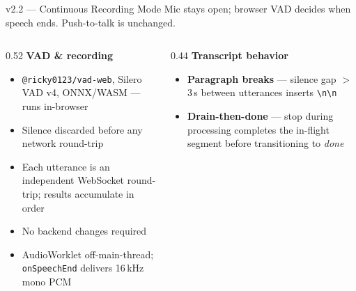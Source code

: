 \documentclass{beamer}
\begin{document}
\begin{frame}{v2.2 --- Continuous Recording Mode}
    \small
    Mic stays open; browser VAD decides when speech ends. Push-to-talk is unchanged.

    \begin{columns}[T]
        \begin{column}{0.52\textwidth}
            \footnotesize\textbf{VAD \& recording}
            \begin{itemize}\setlength{\itemsep}{0pt}\setlength{\parskip}{0pt}
                \item \texttt{@ricky0123/vad-web}, Silero VAD v4,
                      ONNX/WASM --- runs in-browser
                \item Silence discarded before any network round-trip
                \item Each utterance is an independent WebSocket
                      round-trip; results accumulate in order
                \item No backend changes required
                \item AudioWorklet off-main-thread;
                      \texttt{onSpeechEnd} delivers 16\,kHz mono PCM
            \end{itemize}
        \end{column}
        \begin{column}{0.44\textwidth}
            \footnotesize\textbf{Transcript behavior}
            \begin{itemize}\setlength{\itemsep}{0pt}\setlength{\parskip}{0pt}
                \item \textbf{Paragraph breaks} --- silence gap
                      $>$\,3\,s between utterances inserts \texttt{\textbackslash n\textbackslash n}
                \item \textbf{Drain-then-done} --- stop during
                      processing completes the in-flight segment
                      before transitioning to \textit{done}
            \end{itemize}
        \end{column}
    \end{columns}
\end{frame}
\end{document}
